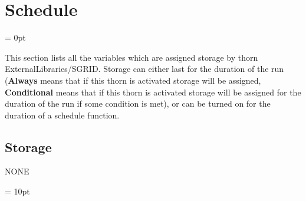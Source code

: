 
\section{Schedule} 


\parskip = 0pt


\noindent This section lists all the variables which are assigned storage by thorn ExternalLibraries/SGRID.  Storage can either last for the duration of the run ({\bf Always} means that if this thorn is activated storage will be assigned, {\bf Conditional} means that if this thorn is activated storage will be assigned for the duration of the run if some condition is met), or can be turned on for the duration of a schedule function.


\subsection*{Storage}NONE

\vspace{5mm}\parskip = 10pt 
